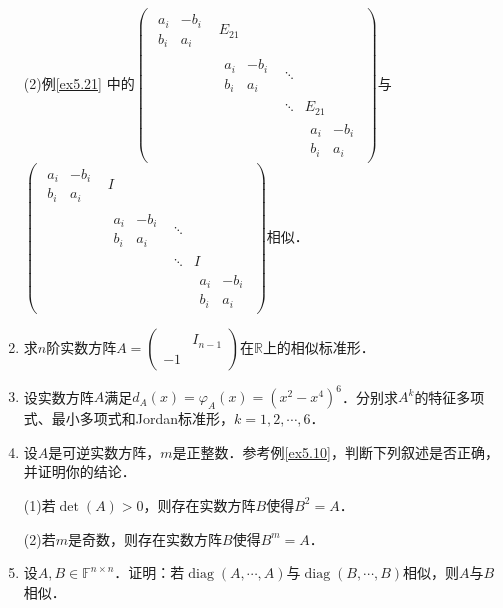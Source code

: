 \documentclass[a4paper,fontset=windows]{ctexbook}
\theoremstyle{definition}
\DeclareMathOperator{\diag}{diag}
\begin{document}
\begin{enumerate}
(2)例\ref{ex5.21} 中的$\begin{pmatrix}\begin{smallmatrix}a_i&-b_i \\ b_i&a_i\end{smallmatrix}&E_{21}&& \\ &\begin{smallmatrix}a_i&-b_i \\ b_i&a_i\end{smallmatrix}&\ddots& \\ &&\ddots&E_{21} \\ &&&\begin{smallmatrix}a_i&-b_i \\ b_i&a_i\end{smallmatrix}\end{pmatrix}$与$\begin{pmatrix}\begin{smallmatrix}a_i&-b_i \\ b_i&a_i\end{smallmatrix}&I&& \\ &\begin{smallmatrix}a_i&-b_i \\ b_i&a_i\end{smallmatrix}&\ddots& \\ &&\ddots&I \\ &&&\begin{smallmatrix}a_i&-b_i \\ b_i&a_i\end{smallmatrix}\end{pmatrix}$相似．

\item 求$n$阶实数方阵$A=\begin{pmatrix}&I_{n-1} \\ -1&\end{pmatrix}$在$\mathbb{R}$上的相似标准形．

\item 设实数方阵$A$满足$d_A(x)=\varphi_A(x)=(x^2-x^4)^6$．分别求$A^k$的特征多项式、最小多项式和Jordan标准形，$k=1,2,\cdots,6$．

\item 设$A$是可逆实数方阵，$m$是正整数．参考例\ref{ex5.10}，判断下列叙述是否正确，并证明你的结论．

(1)若$\det(A)>0$，则存在实数方阵$B$使得$B^2=A$．

(2)若$m$是奇数，则存在实数方阵$B$使得$B^m=A$．

\item 设$A,B\in\mathbb{F}^{n\times n}$．证明：若$\diag(A,\cdots,A)$与$\diag(B,\cdots,B)$相似，则$A$与$B$相似．


\end{enumerate}
\end{document}
